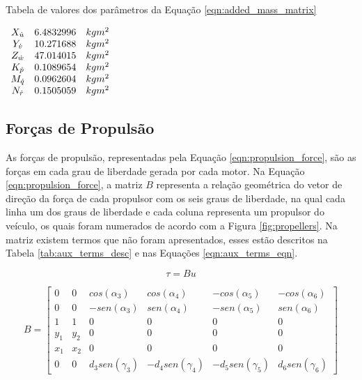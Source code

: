 \begin{table}[H]
	\centering
	\label{tab:added_mass_matrix_params}
	\caption{Tabela de valores dos parâmetros da Equação \ref{eqn:added_mass_matrix}}
	$\begin{array}{c c c}
		\begin{matrix} 
			X_{\dot{u}} & 6.4832996 & kg m^{2}\\ 
			Y_{\dot{v}} & 10.271688 & kg m^{2}\\ 
			Z_{\dot{w}} & 47.014015 & kg m^{2}\\ 
			K_{\dot{p}} & 0.1089654 & kg m^{2}\\
			M_{\dot{q}} & 0.0962604 & kg m^{2}\\
			N_{\dot{r}} & 0.1505059 & kg m^{2}
		\end{matrix}
	\end{array}$
\end{table}

\subsection{Forças de Propulsão}

As forças de propulsão, representadas pela Equação \ref{eqn:propulsion_force}, são as forças em cada grau de liberdade gerada por cada motor. Na Equação \ref{eqn:propulsion_force}, a matriz $B$ representa a relação geométrica do vetor de direção da força de cada propulsor com os seis graus de liberdade, na qual cada linha um dos graus de liberdade e cada coluna representa um propulsor do veículo, os quais foram numerados de acordo com a Figura \ref{fig:propellers}. Na matriz existem termos que não foram apresentados, esses estão descritos na Tabela \ref{tab:aux_terms_desc} e nas Equações \ref{eqn:aux_terms_eqn}.

\begin{equation}
	\label{eqn:propulsion_force}
	\tau = Bu 
\end{equation}

\begin{equation}
	\label{eqn:b_matrix}
	B =
	\begin{bmatrix}
		0 & 0 & cos(\alpha_3) & cos(\alpha_4) & -cos(\alpha_5) & -cos(\alpha_6)\\
		0 & 0 & -sen(\alpha_3) & sen(\alpha_4) & -sen(\alpha_5) & sen(\alpha_6)\\
		1 & 1 & 0 & 0 & 0 & 0\\
		y_1 & y_2 & 0 & 0 & 0 & 0\\
		x_1 & x_2 & 0 & 0 & 0 & 0\\
		0 & 0 & d_3sen(\gamma_3) & -d_4sen(\gamma_4) & -d_5sen(\gamma_5) & d_6sen(\gamma_6) 
	\end{bmatrix}  
\end{equation}

